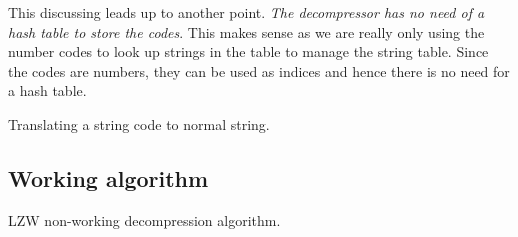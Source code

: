 \begin{refsection}
This discussing leads up to another point. \textit{The decompressor
  has no need of a hash table to store the codes}. This makes sense as
we are really only using the number codes to look up strings in the
table to manage the string table. Since the codes are numbers, they
can be used as indices and hence there is no need for a hash table.

\begin{algorithm}[H]
  \caption{Translating a string code to normal string.}
  \label{alg:translate-string-code}
  \begin{algorithmic}[1]
    \While{\True}

        \Break
      \Else
      \EndIf
    \EndWhile
  \end{algorithmic}
\end{algorithm}

\subsection{Working algorithm}

\begin{algorithm}[H]
  \caption{LZW non-working decompression algorithm.}
  \label{alg:lzw-non-working-decompression}
  \begin{algorithmic}[1]
    \State {}



      \Else
      \EndIf

      \State {}

       

      \State {}




\end{algorithmic}
\end{algorithm}
\end{refsection}
